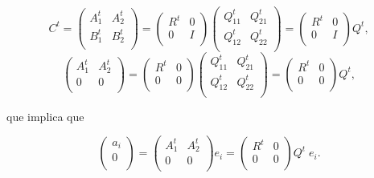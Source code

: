 $$
C^t = \left(
\begin{array}{ll}
A^t_1 & A^t_2\\
B^t_1 & B^t_2 \\
\end{array} \right) =
\left(
\begin{array}{cc}
R^t & 0 \\
0 & I \\
\end{array}
\right)
\left(
\begin{array}{ll}
Q^t_{11} & Q^t_{21} \\
Q^t_{12} & Q^t_{22} \\
\end{array}
\right) =
\left(
\begin{array}{cc}
R^t & 0 \\
0 & I \\
\end{array}
\right)
Q^t,
$$
$$
\left(
\begin{array}{cc}
A^t_1 & A^t_2\\
0 & 0 \\
\end{array} \right) =
\left(
\begin{array}{cc}
R^t & 0 \\
0 & 0\\
\end{array}
\right)
\left(
\begin{array}{ll}
Q^t_{11} & Q^t_{21} \\
Q^t_{12} & Q^t_{22} \\
\end{array}
\right) =
\left(
\begin{array}{cc}
R^t & 0 \\
0 & 0\\
\end{array}
\right)
Q^t,
$$

\noindent que implica que

$$
\left(
\begin{array}{c}
a_i\\
0 \\
\end{array} \right) =
\left(
\begin{array}{cc}
A^t_1 & A^t_2\\
0 & 0 \\
\end{array} \right)  e_i =
\left(
\begin{array}{cc}
R^t & 0 \\
0 & 0\\
\end{array}
\right)
Q^t \; e_i.
$$

